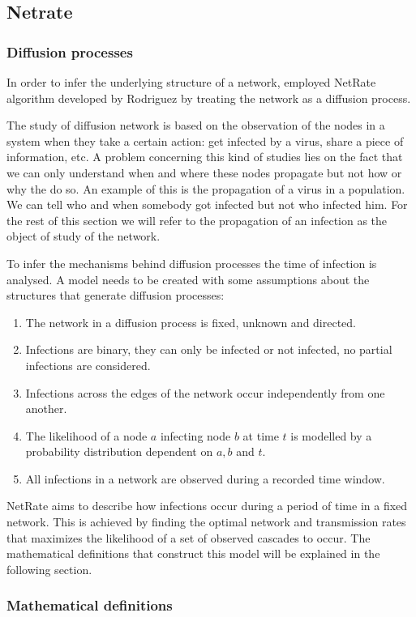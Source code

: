 \documentclass{article}
\begin{document}
\subsection{Netrate}

\subsubsection{Diffusion processes}

In order to infer the underlying structure of a network, \cite{alexandru2018estimating} employed  NetRate algorithm developed by Rodriguez \cite{rodriguez2011uncovering} by treating the network as a diffusion process.

The study of diffusion network is based on the observation of the nodes in a system when they take a certain action: get infected by a virus, share a piece of information, etc. A problem concerning this kind of studies lies on the fact that we can only understand when and where these nodes propagate but not how or why the do so. An example of this is the propagation of a virus in a population. We can tell who and when somebody got infected but not who infected him. For the rest of this section we will refer to the propagation of an infection as the object of study of the network. 

To infer the mechanisms behind diffusion processes the time of infection is analysed. A model needs to be created with some assumptions about the structures that generate diffusion processes:

\begin{enumerate}
\item The network in a diffusion process is fixed, unknown and directed.
\item Infections are binary, they can only be infected or not infected, no partial infections are considered.
\item Infections across the edges of the network occur independently from one another.
\item The likelihood of a node $a$ infecting node $b$ at time $t$ is modelled by a probability distribution dependent on $a, b$ and $t$.
\item All infections in a network are observed during a recorded time window.
\end{enumerate}

NetRate aims to describe how infections occur during a period of time in a fixed network. This is achieved by finding the optimal network and transmission rates that maximizes the likelihood of a set of observed cascades to occur. The mathematical definitions that construct this model will be explained in the following section.


\subsubsection{Mathematical definitions}



\printbibliography 
\end{document}
